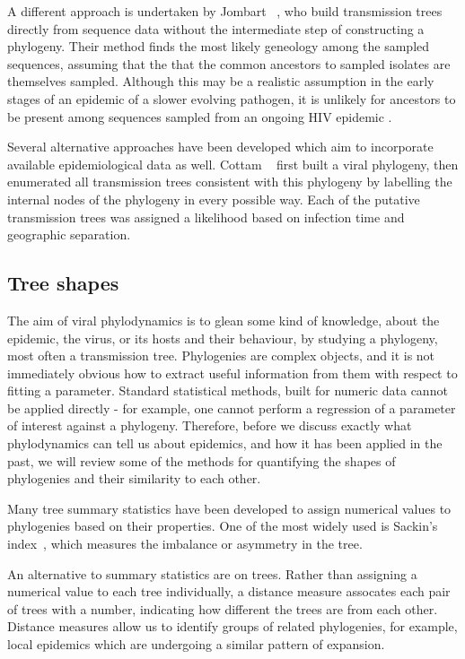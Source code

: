 A different approach is undertaken by Jombart
\etal~\autocite{jombart2011reconstructing}, who build transmission trees
directly from sequence data without the intermediate step of constructing a
phylogeny. Their method finds the most likely geneology among the sampled
sequences, assuming that the that the common ancestors to sampled isolates are
themselves sampled. Although this may be a realistic assumption in the early
stages of an epidemic of a slower evolving pathogen, it is unlikely for
ancestors to be present among sequences sampled from an ongoing HIV epidemic
.

Several alternative approaches have been developed which aim to
incorporate available epidemiological data as well. Cottam
\etal~\autocite{cottam2008integrating} first built a viral phylogeny, then
enumerated all transmission trees consistent with this phylogeny by labelling
the internal nodes of the phylogeny in every possible way. Each of the putative
transmission trees was assigned a likelihood based on infection time and
geographic separation. 


\subsection{Tree shapes}
\label{subsubsec:treeshape}

The aim of viral phylodynamics is to glean some kind of knowledge, about the
epidemic, the virus, or its hosts and their behaviour, by studying a phylogeny,
most often a transmission tree. Phylogenies are complex objects, and it is not
immediately obvious how to extract useful information from them with respect to
fitting a parameter. Standard statistical methods, built for numeric data
cannot be applied directly - for example, one cannot perform a regression of a
parameter of interest against a phylogeny. Therefore, before we discuss exactly
what phylodynamics can tell us about epidemics, and how it has been applied in
the past, we will review some of the methods for quantifying the shapes of
phylogenies and their similarity to each other.

Many tree summary statistics have been developed to assign numerical values to
phylogenies based on their properties. One of the most widely used is Sackin's
index~\cite{shao1990tree}, which measures the imbalance or asymmetry in the
tree.

An alternative to summary statistics are  on trees.
Rather than assigning a numerical value to each tree individually, a distance
measure assocates each pair of trees with a number, indicating how different
the trees are from each other. Distance measures allow us to identify groups of
related phylogenies, for example, local epidemics which are undergoing a
similar pattern of expansion.

